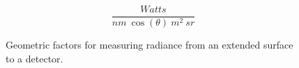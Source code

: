 \documentclass[
  letterpaper,
]{book}
\begin{document}
\[ 
\frac{Watts}{nm ~ \cos(\theta) ~ m^2 ~ sr}
\]

\begin{figure}


\caption{\label{fig-foreshortening-sketch}Geometric factors for
measuring radiance from an extended surface to a detector.}

\end{figure}%
\end{document}
